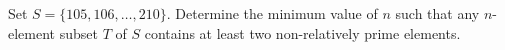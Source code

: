 \begin{problem} [\cite{104NT}/ 3.4]

    Set $S= \{ 105, 106, \ldots, 210\}$. Determine the minimum value of $n$ such that any $n$-element subset $T$ of $S$ contains at least two non-relatively prime elements. 
     \label{[1]3.4}
 \end{problem}
     